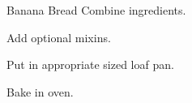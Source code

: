 \documentclass[letterpaper]{book}
\begin{document}
\begin{recipe}{Banana Bread}{}{}
    Combine ingredients.

    Add optional mixins.

    \newstep
    Put in appropriate sized loaf pan.

    \newstep
    Bake in oven.
\end{recipe}
\end{document}
